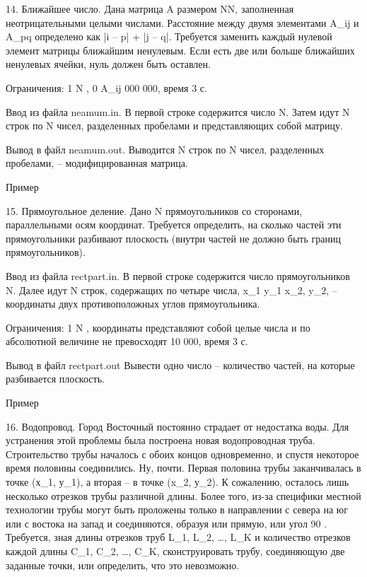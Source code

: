 \documentclass[]{article}
\begin{document}
14. Ближайшее число. Дана матрица A размером N\times N, заполненная неотрицательными целыми числами. Расстояние между двумя элементами A_{ij} и A_{pq} определено как |i – p| + |j – q|. Требуется заменить каждый нулевой элемент матрицы ближайшим ненулевым. Если есть две или больше ближайших ненулевых ячейки, нуль должен быть оставлен.

Ограничения: 1 \leq N , 0 \leq A_{ij}  000 000, время 3 с.

Ввод из файла neamum.in. В первой строке содержится число N. Затем идут N строк по N чисел, разделенных пробелами и представляющих собой матрицу.

Вывод в файл neamum.out. Выводится N строк по N чисел, разделенных пробелами, – модифицированная матрица.

Пример



15. Прямоугольное деление. Дано N прямоугольников со сторонами, параллельными осям координат. Требуется определить, на сколько частей эти прямоугольники разбивают плоскость (внутри частей не должно быть границ прямоугольников).

Ввод из файла rectpart.in. В первой строке содержится число прямоугольников N. Далее идут N строк, содержащих по четыре числа, x_1 y_1 x_2, y_2, – координаты двух противоположных углов прямоугольника.

Ограничения: 1 \leq N , координаты представляют собой целые числа и по абсолютной величине не превосходят 10 000, время 3 с.

Вывод в файл rectpart.out Вывести одно число – количество частей, на которые разбивается плоскость.

Пример



16. Водопровод. Город Восточный постоянно страдает от недостатка воды. Для устранения этой проблемы была построена новая водопроводная труба. Строительство трубы началось с обоих концов одновременно, и спустя некоторое время половины соединились. Ну, почти. Первая половина трубы заканчивалась в точке (х_1, у_1), а вторая – в точке (x_2, у_2). К сожалению, осталось лишь несколько отрезков трубы различной длины. Более того, из-за специфики местной технологии трубы могут быть проложены только в направлении с севера на юг или с востока на запад и соединяются, образуя или прямую, или угол 90 \deg. Требуется, зная длины отрезков труб L_1, L_2, \ldots, L_K и количество отрезков каждой длины C_1, C_2, \ldots, C_K, сконструировать трубу, соединяющую две заданные точки, или определить, что это невозможно.
\end{document}
